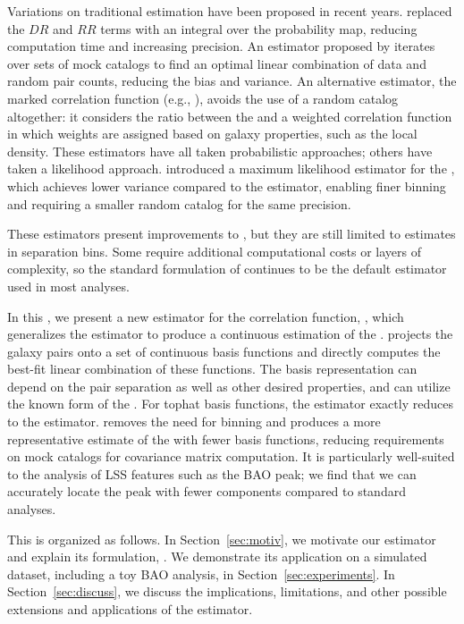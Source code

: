 Variations on traditional \cf estimation have been proposed in recent years.
\cite{Demina2016} replaced the $DR$ and $RR$ terms with an integral over the probability map, reducing computation time and increasing precision.
An estimator proposed by \cite{VargasMagana2013} iterates over sets of mock catalogs to find an optimal linear combination of data and random pair counts, reducing the bias and variance.
An alternative estimator, the marked correlation function (e.g., \citealt{WhitePadmanabhan2009}), avoids the use of a random catalog altogether: it considers the ratio between the \cf and a weighted correlation function in which weights are assigned based on galaxy properties, such as the local density.
These estimators have all taken probabilistic approaches; others have taken a likelihood approach.
\cite{BaxterRozo2013} introduced a maximum likelihood estimator for the \cf, which achieves lower variance compared to the \LS estimator, enabling finer binning and requiring a smaller random catalog for the same precision.

These estimators present improvements to \LS, but they are still limited to estimates in separation bins.
Some require additional computational costs or layers of complexity, so the standard formulation of \LS continues to be the default estimator used in most analyses.

In this \documentname, we present a new estimator for the correlation function, \est, which generalizes the \LS estimator to produce a continuous estimation of the \cf. 
\Est projects the galaxy pairs onto a set of continuous basis functions and directly computes the best-fit linear combination of these functions.
The basis representation can depend on the pair separation as well as other desired properties, and can utilize the known form of the \cf.
For tophat basis functions, the estimator exactly reduces to the \LS estimator. 
\Est removes the need for binning and produces a more representative estimate of the \cf with fewer basis functions,  reducing requirements on mock catalogs for covariance matrix computation.
It is particularly well-suited to the analysis of LSS features such as the BAO peak; we find that we can accurately locate the peak with fewer components compared to standard analyses.

This \documentname is organized as follows. 
In Section~\ref{sec:motiv}, we motivate our estimator and explain its formulation, .
We demonstrate its application on a simulated dataset, including a toy BAO analysis, in Section~\ref{sec:experiments}.
In Section~\ref{sec:discuss}, we discuss the implications, limitations, and other possible extensions and applications of the estimator. 

